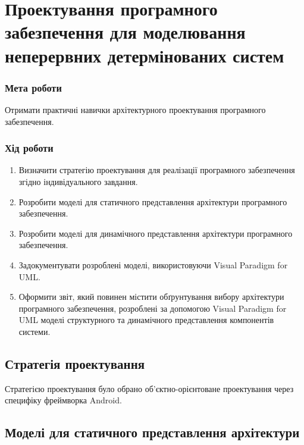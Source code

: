 


\newcommand{\labnumber}{3} %



\graphicspath{{figures/}}


\Ukrainian


\addtocounter{page}{1}

\section*{Проектування програмного забезпечення для моделювання неперервних детермінованих систем}
\subsubsection*{Мета роботи}
Отримати практичні навички архітектурного проектування
програмного забезпечення.
\subsubsection*{Хід роботи}
\begin{enumerate}
\item Визначити стратегію проектування для реалізації програмного забезпечення згідно індивідуального завдання.
\item Розробити моделі для статичного представлення архітектури програмного забезпечення.
\item Розробити моделі для динамічного представлення архітектури програмного забезпечення.
\item Задокументувати розроблені моделі, використовуючи Visual Paradigm for UML.
\item Оформити звіт, який повинен містити обґрунтування вибору архітектури програмного забезпечення, розроблені за допомогою Visual Paradigm for UML моделі структурного та динамічного представлення компонентів системи.
\end{enumerate}

\subsection{Стратегія проектування}
Стратегією проектування було обрано об'єктно-орієнтоване проектування через специфіку фреймворка Android.

\subsection{Моделі для статичного представлення архітектури}

